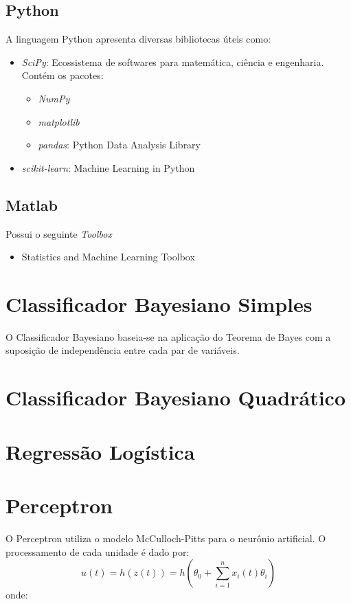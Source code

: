 \documentclass[11pt,a4paper]{article}
\numberwithin{equation}{section}
\begin{document}
\subsection{Python}
A linguagem Python apresenta diversas bibliotecas úteis como:
\begin{itemize}
\item \textit{SciPy}: Ecossistema de softwares para matemática, ciência e engenharia. Contém os pacotes:
\begin{itemize}
\item \textit{NumPy}
\item \textit{matplotlib}
\item \textit{pandas}: Python Data Analysis Library
\end{itemize}
\item \textit{scikit-learn}: Machine Learning in Python
\end{itemize}

\subsection{Matlab}
Possui o seguinte \textit{Toolbox}
\begin{itemize}
\item Statistics and Machine Learning Toolbox
\end{itemize}

\section{Classificador Bayesiano Simples}

O Classificador Bayesiano baseia-se na aplicação do Teorema de Bayes com a suposição de independência entre cada par de variáveis. 

\section{Classificador Bayesiano Quadrático}
\section{Regressão Logística}
\section{Perceptron}
O Perceptron utiliza o modelo McCulloch-Pitts para o neurônio artificial. O processamento de cada unidade é dado por:
\[ u(t) = h(z(t)) = h \left( \theta_0 + \sum_{i=1}^n x_i(t) \theta_i \right) \]
onde:
\end{document}
